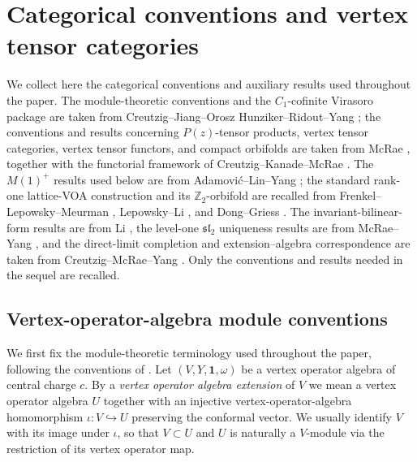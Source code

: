 \documentclass[10pt,a4paper]{amsart}
\numberwithin{equation}{section} \newtheorem{thm}{Theorem}[section] \newtheorem{lem}[thm]{Lemma} \newtheorem{ex}[thm]{Example} \newtheorem{prop}[thm]{Proposition} \newtheorem{cor}[thm]{Corollary} \newtheorem{defi}[thm]{Definition} \newtheorem{rmk}[thm]{Remark} \newtheorem{notation}[thm]{Notation}
\newcommand{\one}{\mathbf{1}}
\begin{document}
\section{Categorical conventions and vertex tensor categories}
\label{sec:categorical}

We collect here the categorical conventions and auxiliary results used throughout the paper. The module-theoretic conventions and the $C_1$-cofinite Virasoro package are taken from Creutzig--Jiang--Orosz Hunziker--Ridout--Yang \cite{CJORY}; the conventions and results concerning $P(z)$-tensor products, vertex tensor categories, vertex tensor functors, and compact orbifolds are taken from McRae \cite{McRae}, together with the functorial framework of Creutzig--Kanade--McRae \cite{CKM}. The $M(1)^+$ results used below are from Adamovi\'c--Lin--Yang \cite{ALY}; the standard rank-one lattice-VOA construction and its $\mathbb Z_2$-orbifold are recalled from Frenkel--Lepowsky--Meurman \cite[Chapter~8]{FLM}, Lepowsky--Li \cite[Sections~6.4--6.5]{LepowskyLi}, and Dong--Griess \cite[Section~2]{DG98}. The invariant-bilinear-form results are from Li \cite{LiInvariant}, the level-one $\mathfrak{sl}_2$ uniqueness results are from McRae--Yang \cite{MY}, and the direct-limit completion and extension--algebra correspondence are taken from Creutzig--McRae--Yang \cite{CMY}. Only the conventions and results needed in the sequel are recalled.

\subsection{Vertex-operator-algebra module conventions}
\label{subsec:module-conventions}

We first fix the module-theoretic terminology used throughout the paper, following the conventions of \cite[Section~2.1]{CJORY}. Let $(V,Y,\one,\omega)$ be a vertex operator algebra of central charge $c$. By a \emph{vertex operator algebra extension} of $V$ we mean a vertex operator algebra $U$ together with an injective vertex-operator-algebra homomorphism $\iota:V\hookrightarrow U$ preserving the conformal vector. We usually identify $V$ with its image under $\iota$, so that $V\subset U$ and $U$ is naturally a $V$-module via the restriction of its vertex operator map.
\end{document}
